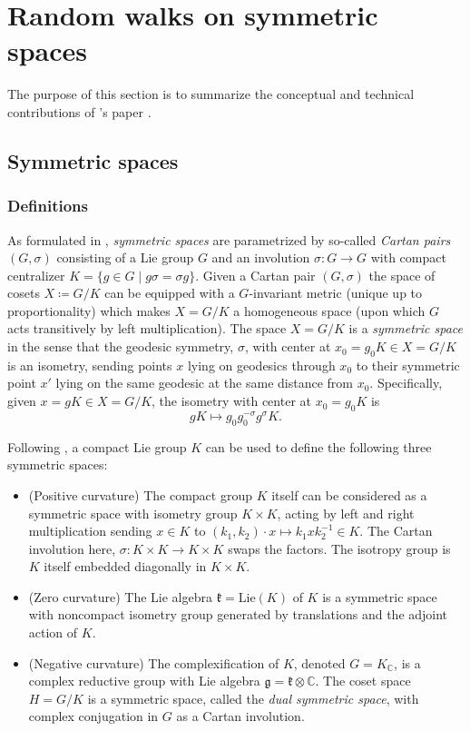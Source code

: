 \documentclass[notitlepage]{article}
\begin{document}
\clearpage
\section{Random walks on symmetric spaces}

The purpose of this section is to summarize the conceptual and technical contributions of \citeauthor{klyachko2000random}'s paper  \cite{klyachko2000random}.

\subsection{Symmetric spaces}

\subsubsection{Definitions}

As formulated in \cite[Sec. 2.1]{klyachko2000random}, \textit{symmetric spaces} are parametrized by so-called \textit{Cartan pairs} $(G, \sigma)$ consisting of a Lie group $G$ and an involution $\sigma : G \to G$ with compact centralizer $K = \{ g \in G \mid g \sigma = \sigma g\}$.
Given a Cartan pair $(G, \sigma)$ the space of cosets $X \coloneqq G/K$ can be equipped with a $G$-invariant metric (unique up to proportionality) which makes $X = G/K$ a homogeneous space (upon which $G$ acts transitively by left multiplication).
The space $X = G/K$ is a \textit{symmetric space} in the sense that the geodesic symmetry, $\sigma$, with center at $x_0 = g_0 K \in X = G/K$ is an isometry, sending points $x$ lying on geodesics through $x_0$ to their symmetric point $x'$ lying on the same geodesic at the same distance from $x_0$.
Specifically, given $x = g K \in X = G/K$, the isometry with center at $x_0 = g_0 K$ is
\begin{equation}
    g K \mapsto g_0 g_0^{-\sigma} g^{\sigma} K.
\end{equation}

Following \cite[Sec. 2.2.2]{klyachko2000random}, a compact Lie group $K$ can be used to define the following three symmetric spaces:
\begin{itemize}
    \item (Positive curvature) The compact group $K$ itself can be considered as a symmetric space with isometry group $K \times K$, acting by left and right multiplication sending $x \in K$ to $(k_1, k_2) \cdot x \mapsto k_1 x k_2^{-1} \in K$. The Cartan involution here, $\sigma : K \times K \to K \times K$ swaps the factors. The isotropy group is $K$ itself embedded diagonally in $K \times K$.
    \item (Zero curvature) The Lie algebra $\mathfrak k = \mathrm{Lie}(K)$ of $K$ is a symmetric space with noncompact isometry group generated by translations and the adjoint action of $K$.
    \item (Negative curvature) The complexification of $K$, denoted $G = K_{\mathbb C}$, is a complex reductive group with Lie algebra $\mathfrak g = \mathfrak k \otimes \mathbb C$. The coset space $H = G/K$ is a symmetric space, called the \textit{dual symmetric space}, with complex conjugation in $G$ as a Cartan involution.
\end{itemize}
\end{document}
